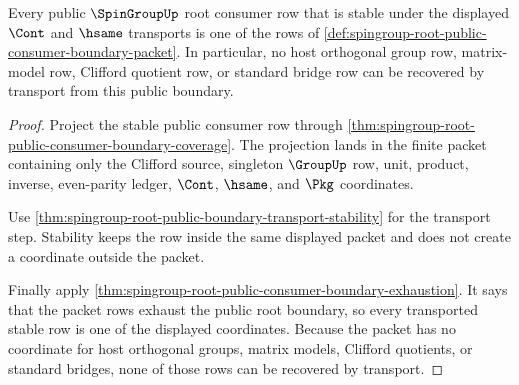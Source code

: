\begin{theorem}
\label{thm:spingroup-root-public-boundary-no-extra-row}
Every public $\SpinGroupUp$ root consumer row that is stable under the
displayed $\Cont$ and $\hsame$ transports is one of the rows of
\autoref{def:spingroup-root-public-consumer-boundary-packet}. In particular,
no host orthogonal group row, matrix-model row, Clifford quotient row, or
standard bridge row can be recovered by transport from this public boundary.
\end{theorem}
\begin{proof}
Project the stable public consumer row through
\autoref{thm:spingroup-root-public-consumer-boundary-coverage}. The projection
lands in the finite packet containing only the Clifford source, singleton
$\GroupUp$ row, unit, product, inverse, even-parity ledger, $\Cont$, $\hsame$,
and $\Pkg$ coordinates.

Use
\autoref{thm:spingroup-root-public-boundary-transport-stability} for the
transport step. Stability keeps the row inside the same displayed packet and
does not create a coordinate outside the packet.

Finally apply
\autoref{thm:spingroup-root-public-consumer-boundary-exhaustion}. It says that
the packet rows exhaust the public root boundary, so every transported stable
row is one of the displayed coordinates. Because the packet has no coordinate
for host orthogonal groups, matrix models, Clifford quotients, or standard
bridges, none of those rows can be recovered by transport.
\end{proof}

